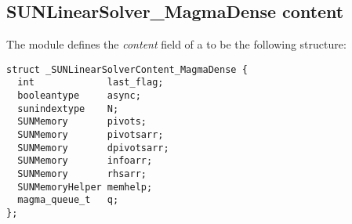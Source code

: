 \subsection{SUNLinearSolver\_MagmaDense content}\label{ss:sunlinsol_magmadense_content}

The  module defines the
{\em content} field of a  to be the following structure:
\begin{verbatim}
struct _SUNLinearSolverContent_MagmaDense {
  int             last_flag;
  booleantype     async;
  sunindextype    N;
  SUNMemory       pivots;
  SUNMemory       pivotsarr;
  SUNMemory       dpivotsarr;
  SUNMemory       infoarr;
  SUNMemory       rhsarr;
  SUNMemoryHelper memhelp;
  magma_queue_t   q;
};
\end{verbatim}
